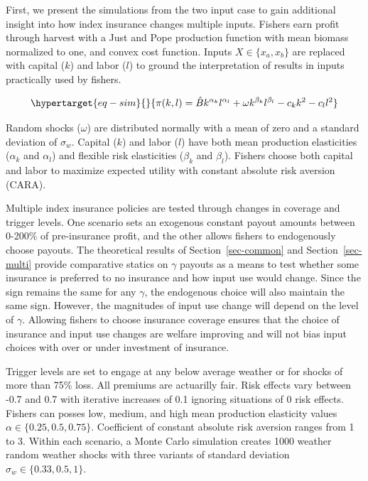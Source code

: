 \documentclass[
  letterpaper,
  DIV=11,
  numbers=noendperiod]{scrartcl}
\theoremstyle{plain}
\theoremstyle{plain}
\theoremstyle{remark}
\begin{document}
First, we present the simulations from the two input case to gain
additional insight into how index insurance changes multiple inputs.
Fishers earn profit through harvest with a Just and Pope production
function with mean biomass normalized to one, and convex cost function.
Inputs \(X \in \{x_a,x_b\}\) are replaced with capital (\(k\)) and labor
(\(l\)) to ground the interpretation of results in inputs practically
used by fishers.

\begin{equation}\protect\hypertarget{eq-sim}{}{
\pi(k,l)=\hat{B}k^{\alpha_k}l^{\alpha_l}+\omega k^{\beta_k}l^{\beta_l}-c_kk^2-c_ll^2
}\label{eq-sim}\end{equation}

Random shocks (\(\omega\)) are distributed normally with a mean of zero
and a standard deviation of \(\sigma_w\). Capital (\(k\)) and labor
(\(l\)) have both mean production elasticities (\(\alpha_k\) and
\(\alpha_l\)) and flexible risk elasticities (\(\beta_k\) and
\(\beta_l\)). Fishers choose both capital and labor to maximize expected
utility with constant absolute risk aversion (CARA).

Multiple index insurance policies are tested through changes in coverage
and trigger levels. One scenario sets an exogenous constant payout
amounts between 0-200\% of pre-insurance profit, and the other allows
fishers to endogenously choose payouts. The theoretical results of
Section~\ref{sec-common} and Section~\ref{sec-multi} provide comparative
statics on \(\gamma\) payouts as a means to test whether some insurance
is preferred to no insurance and how input use would change. Since the
sign remains the same for any \(\gamma\), the endogenous choice will
also maintain the same sign. However, the magnitudes of input use change
will depend on the level of \(\gamma\). Allowing fishers to choose
insurance coverage ensures that the choice of insurance and input use
changes are welfare improving and will not bias input choices with over
or under investment of insurance.

Trigger levels are set to engage at any below average weather or for
shocks of more than 75\% loss. All premiums are actuarilly fair. Risk
effects vary between -0.7 and 0.7 with iterative increases of 0.1
ignoring situations of 0 risk effects. Fishers can posses low, medium,
and high mean production elasticity values
\(\alpha\in\{0.25,0.5,0.75\}\). Coefficient of constant absolute risk
aversion ranges from 1 to 3. Within each scenario, a Monte Carlo
simulation creates 1000 weather random weather shocks with three
variants of standard deviation \(\sigma_w\in\{0.33,0.5,1\}\).
\end{document}
